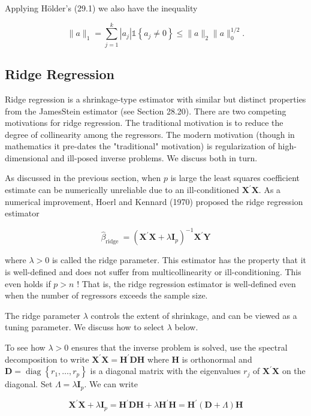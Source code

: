 \documentclass[10pt]{article}
\begin{document}
Applying Hölder's (29.1) we also have the inequality

$$
\|a\|_{1}=\sum_{j=1}^{k}\left|a_{j}\right| \mathbb{1}\left\{a_{j} \neq 0\right\} \leq\|a\|_{2}\|a\|_{0}^{1 / 2} .
$$

\subsection{Ridge Regression}
Ridge regression is a shrinkage-type estimator with similar but distinct properties from the JamesStein estimator (see Section 28.20). There are two competing motivations for ridge regression. The traditional motivation is to reduce the degree of collinearity among the regressors. The modern motivation (though in mathematics it pre-dates the "traditional" motivation) is regularization of high-dimensional and ill-posed inverse problems. We discuss both in turn.

As discussed in the previous section, when $p$ is large the least squares coefficient estimate can be numerically unreliable due to an ill-conditioned $\boldsymbol{X}^{\prime} \boldsymbol{X}$. As a numerical improvement, Hoerl and Kennard (1970) proposed the ridge regression estimator

$$
\widehat{\beta}_{\text {ridge }}=\left(\boldsymbol{X}^{\prime} \boldsymbol{X}+\lambda \boldsymbol{I}_{p}\right)^{-1} \boldsymbol{X}^{\prime} \boldsymbol{Y}
$$

where $\lambda>0$ is called the ridge parameter. This estimator has the property that it is well-defined and does not suffer from multicollinearity or ill-conditioning. This even holds if $p>n$ ! That is, the ridge regression estimator is well-defined even when the number of regressors exceeds the sample size.

The ridge parameter $\lambda$ controls the extent of shrinkage, and can be viewed as a tuning parameter. We discuss how to select $\lambda$ below.

To see how $\lambda>0$ ensures that the inverse problem is solved, use the spectral decomposition to write $\boldsymbol{X}^{\prime} \boldsymbol{X}=\boldsymbol{H}^{\prime} \boldsymbol{D} \boldsymbol{H}$ where $\boldsymbol{H}$ is orthonormal and $\boldsymbol{D}=\operatorname{diag}\left\{r_{1}, \ldots, r_{p}\right\}$ is a diagonal matrix with the eigenvalues $r_{j}$ of $\boldsymbol{X}^{\prime} \boldsymbol{X}$ on the diagonal. Set $\Lambda=\lambda \boldsymbol{I}_{p}$. We can write

$$
\boldsymbol{X}^{\prime} \boldsymbol{X}+\lambda \boldsymbol{I}_{p}=\boldsymbol{H}^{\prime} \boldsymbol{D} \boldsymbol{H}+\lambda \boldsymbol{H}^{\prime} \boldsymbol{H}=\boldsymbol{H}^{\prime}(\boldsymbol{D}+\Lambda) \boldsymbol{H}
$$
\end{document}
